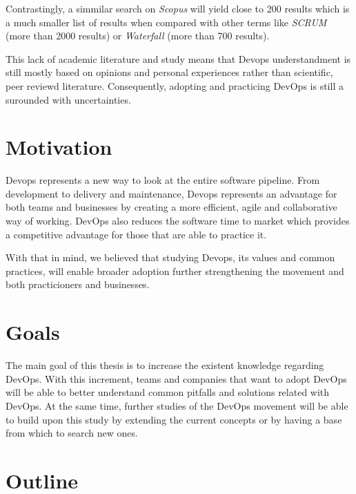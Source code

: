 		Contrastingly, a simmilar search on \textit{Scopus} will yield close to 200 results which is a much smaller list of results when compared with other terms like \textit{SCRUM} (more than 2000 results) or \textit{Waterfall} (more than 700 results).

		This lack of academic literature and study means that Devops understandment is still mostly based on opinions and personal experiences rather than scientific, peer reviewd literature. Consequently, adopting and practicing DevOps is still a surounded with uncertainties.

		\section{Motivation} \label{chap:introduction:sec:motivation}

		Devops represents a new way to look at the entire software pipeline. From development to delivery and maintenance, Devops represents an advantage for both teams and businesses by creating a more efficient, agile and collaborative way of working. DevOps also reduces the software time to market which provides a competitive advantage for those that are able to practice it.

		With that in mind, we believed that studying Devops, its values and common practices, will enable broader adoption further strengthening the movement and both practicioners and businesses.

		\section{Goals}
		The main goal of this thesis is to increase the existent knowledge regarding DevOps. With this increment, teams and companies that want to adopt DevOps will be able to better understand common pitfalls and solutions related with DevOps. At the same time, further studies of the DevOps movement will be able to build upon this study by extending the current concepts or by having a base from which to search new ones.


  	\section{Outline} \label{chap:introduction:sec:outline}

